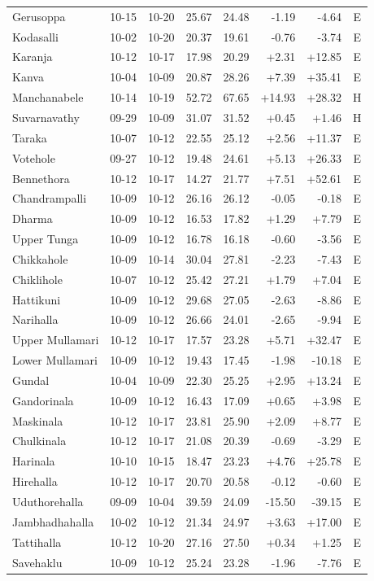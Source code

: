 \documentclass[conference]{IEEEtran}
\begin{document}
\begin{table}[t]
\begin{tabular}{@{}lccccrrc@{}}
Gerusoppa & 10-15 & 10-20 & 25.67 & 24.48 & -1.19 & -4.64 & E \\
Kodasalli & 10-02 & 10-20 & 20.37 & 19.61 & -0.76 & -3.74 & E \\
Karanja & 10-12 & 10-17 & 17.98 & 20.29 & +2.31 & +12.85 & E \\
Kanva & 10-04 & 10-09 & 20.87 & 28.26 & +7.39 & +35.41 & E \\
Manchanabele & 10-14 & 10-19 & 52.72 & 67.65 & +14.93 & +28.32 & H \\
Suvarnavathy & 09-29 & 10-09 & 31.07 & 31.52 & +0.45 & +1.46 & H \\
Taraka & 10-07 & 10-12 & 22.55 & 25.12 & +2.56 & +11.37 & E \\
Votehole & 09-27 & 10-12 & 19.48 & 24.61 & +5.13 & +26.33 & E \\
Bennethora & 10-12 & 10-17 & 14.27 & 21.77 & +7.51 & +52.61 & E \\
Chandrampalli & 10-09 & 10-12 & 26.16 & 26.12 & -0.05 & -0.18 & E \\
Dharma & 10-09 & 10-12 & 16.53 & 17.82 & +1.29 & +7.79 & E \\
Upper Tunga & 10-09 & 10-12 & 16.78 & 16.18 & -0.60 & -3.56 & E \\
Chikkahole & 10-09 & 10-14 & 30.04 & 27.81 & -2.23 & -7.43 & E \\
Chiklihole & 10-07 & 10-12 & 25.42 & 27.21 & +1.79 & +7.04 & E \\
Hattikuni & 10-09 & 10-12 & 29.68 & 27.05 & -2.63 & -8.86 & E \\
Narihalla & 10-09 & 10-12 & 26.66 & 24.01 & -2.65 & -9.94 & E \\
Upper Mullamari & 10-12 & 10-17 & 17.57 & 23.28 & +5.71 & +32.47 & E \\
Lower Mullamari & 10-09 & 10-12 & 19.43 & 17.45 & -1.98 & -10.18 & E \\
Gundal & 10-04 & 10-09 & 22.30 & 25.25 & +2.95 & +13.24 & E \\
Gandorinala & 10-09 & 10-12 & 16.43 & 17.09 & +0.65 & +3.98 & E \\
Maskinala & 10-12 & 10-17 & 23.81 & 25.90 & +2.09 & +8.77 & E \\
Chulkinala & 10-12 & 10-17 & 21.08 & 20.39 & -0.69 & -3.29 & E \\
Harinala & 10-10 & 10-15 & 18.47 & 23.23 & +4.76 & +25.78 & E \\
Hirehalla & 10-12 & 10-17 & 20.70 & 20.58 & -0.12 & -0.60 & E \\
Uduthorehalla & 09-09 & 10-04 & 39.59 & 24.09 & -15.50 & -39.15 & E \\
Jambhadhahalla & 10-02 & 10-12 & 21.34 & 24.97 & +3.63 & +17.00 & E \\
Tattihalla & 10-12 & 10-20 & 27.16 & 27.50 & +0.34 & +1.25 & E \\
Savehaklu & 10-09 & 10-12 & 25.24 & 23.28 & -1.96 & -7.76 & E \\
\bottomrule
\end{tabular}
\end{table}
\end{document}
